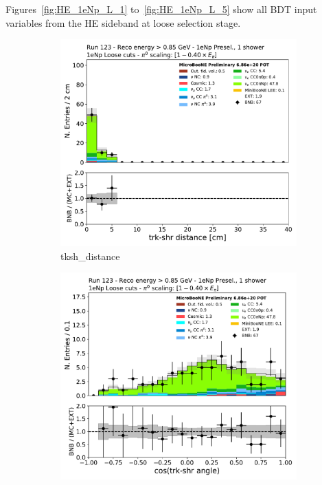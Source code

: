 \newpage

Figures~\ref{fig:HE_1eNp_L_1} to~\ref{fig:HE_1eNp_L_5} show all BDT input variables from the HE sideband at loose selection stage.

\begin{figure}[H]
    \centering
    \begin{subfigure}{0.3\textwidth}
    \includegraphics[width=1.0\textwidth]{Sidebands/Figures/1eNp/HighEnergy/HiEext_NPOneShr_NPL_pi0e040/tksh_distance.pdf}
    \caption{tksh\_distance}
    \end{subfigure}
    \begin{subfigure}{0.3\textwidth}
    \includegraphics[width=1.0\textwidth]{Sidebands/Figures/1eNp/HighEnergy/HiEext_NPOneShr_NPL_pi0e040/tksh_angle.pdf}

\end{subfigure}
\end{figure}
